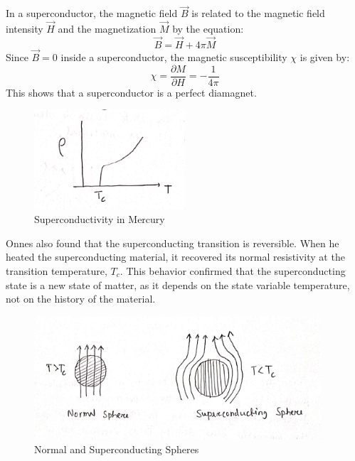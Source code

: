 \documentclass{article}
\begin{document}
In a superconductor, the magnetic field \(\vec{B}\) is related to the magnetic field intensity \(\vec{H}\) and the magnetization \(\vec{M}\) by the equation:
\[
\vec{B} = \vec{H} + 4\pi \vec{M}
\]
Since \(\vec{B} = 0\) inside a superconductor, the magnetic susceptibility \(\chi\) is given by:
\[
\chi = \frac{\partial M}{\partial H} = -\frac{1}{4\pi}
\]
This shows that a superconductor is a perfect diamagnet.

\begin{figure}
    \begin{center}
        \includegraphics[width=0.5\textwidth]{figures/1.png}
    \end{center}
    \caption{Superconductivity in Mercury}\label{fig:}
\end{figure}


Onnes also found that the superconducting transition is reversible. When he heated the superconducting material, it recovered its normal resistivity at the transition temperature, \(T_c\). This behavior confirmed that the superconducting state is a new state of matter, as it depends on the state variable temperature, not on the history of the material.

\begin{figure}
    \begin{center}
        \includegraphics[width=0.95\textwidth]{figures/2.png}
    \end{center}
    \caption{Normal and Superconducting Spheres}\label{fig:}
\end{figure}
\end{document}
